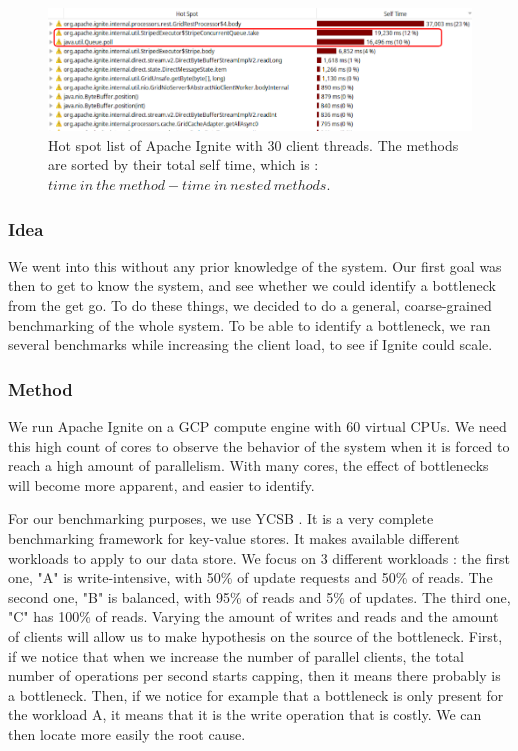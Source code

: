 \documentclass[conference]{IEEEtran}
\begin{document}
\begin{figure}[!ht]
\includegraphics[width=\textwidth]{hotspot.png}
\caption{Hot spot list of Apache Ignite with 30 client threads. The methods are sorted by their total self time, which is : $time\ in\ the\ method - time\ in\ nested\ methods$.}
\label{hotspot}
\end{figure}

\subsubsection{Idea}
We went into this without any prior knowledge of the system. Our first goal was then to get to know the system, and see whether we could identify a bottleneck from the get go. To do these things, we decided to do a general, coarse-grained benchmarking of the whole system. To be able to identify a bottleneck, we ran several benchmarks while increasing the client load, to see if Ignite could scale.
\subsubsection{Method}
We run Apache Ignite on a GCP compute engine with 60 virtual CPUs. We need this high count of cores to observe the behavior of the system when it is forced to reach a high amount of parallelism. With many cores, the effect of bottlenecks will become more apparent, and easier to identify.

For our benchmarking purposes, we use YCSB \cite{YCSB}. It is a very complete benchmarking framework for key-value stores. It makes available different workloads to apply to our data store. We focus on 3 different workloads : the first one, "A" is write-intensive, with 50\% of update requests and 50\% of reads. The second one, "B" is balanced, with 95\% of reads and 5\% of updates. The third one, "C" has 100\% of reads.
Varying the amount of writes and reads and the amount of clients will allow us to make hypothesis on the source of the bottleneck. 
First, if we notice that when we increase the number of parallel clients, the total number of operations per second starts capping, then it means there probably is a bottleneck. Then, if we notice for example that a bottleneck is only present for the workload A, it means that it is the write operation that is costly. We can then locate more easily the root cause.
\end{document}
